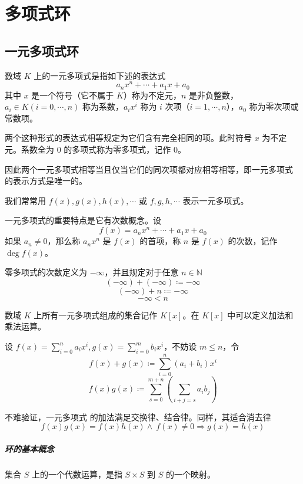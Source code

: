 \chapter{多项式环}

\section{一元多项式环}

\begin{definition}[一元多项式]
	数域 $K$ 上的一元多项式是指如下述的表达式
	\[a_nx^n+\cdots + a_1x + a_0\]
	其中 $x$ 是一个符号（它不属于 $K$）称为不定元，$n$ 是非负整数，$a_i\in K(i=0,\cdots,n)$ 称为系数，$a_ix^i$ 称为 $i$ 次项（$i=1,\cdots,n$），$a_0$ 称为零次项或常数项。
\end{definition}

两个这种形式的表达式相等规定为它们含有完全相同的项。此时符号 $x$ 为不定元。系数全为 $0$ 的多项式称为零多项式，记作 $0$。

因此两个一元多项式相等当且仅当它们的同次项都对应相等相等，即一元多项式 的表示方式是唯一的。

我们常常用 $f(x),g(x),h(x),\cdots$ 或 $f,g,h,\cdots$ 表示一元多项式。

一元多项式的重要特点是它有次数概念。设
\[f(x) = a_nx^n+\cdots + a_1x + a_0\]
如果 $a_n\ne 0$，那么称 $a_nx^n$ 是 $f(x)$ 的首项，称 $n$ 是 $f(x)$ 的次数，记作 $\deg f(x)$。

零多项式的次数定义为 $-\infty$，并且规定对于任意 $n\in \mathbb{N}$
\[(-\infty)+(-\infty)\coloneqq -\infty\]
\[(-\infty) +n \coloneqq  -\infty\]
\[-\infty < n\]

数域 $K$ 上所有一元多项式组成的集合记作 $K[x]$。在 $K[x]$ 中可以定义加法和乘法运算。

设 $f(x) = \displaystyle\sum_{i=0}^na_ix^i,g(x) = \sum_{i=0}^mb_ix^i$，不妨设 $m \leqslant n$，令
\[f(x) + g(x) \coloneqq  \sum_{i=0}^n(a_i+b_i)x^i\]
\[f(x)g(x) \coloneqq  \sum_{s=0}^{m+n}\left(\sum_{i+j=s}a_ib_j\right)\]

不难验证，一元多项式 的加法满足交换律、结合律。同样，其适合消去律
\[f(x)g(x) = f(x)h(x) \land \ f(x)\ne 0 \Rightarrow g(x) = h(x)\]

\paragraph{环的基本概念}

集合 $S$ 上的一个代数运算，是指 $S\times S$ 到 $S$ 的一个映射。

